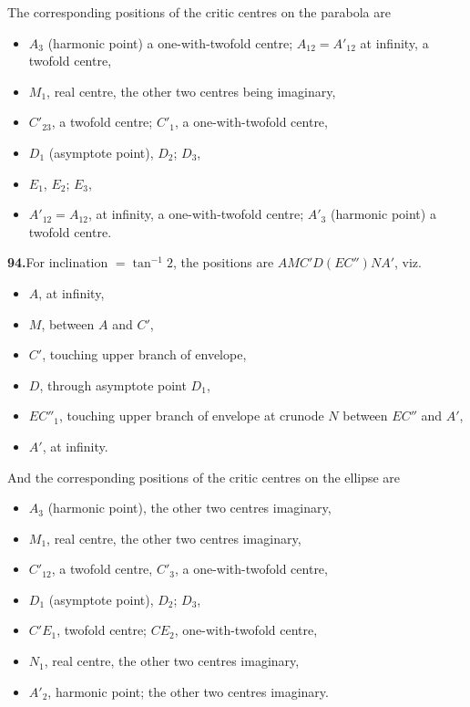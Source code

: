 \documentclass[11pt]{article}
\begin{document}
The corresponding positions of the critic centres on the parabola are
\begin{itemize}\itemsep0pt
\item $A_{3}$ (harmonic point) a one-with-twofold centre; $A_{12} = A'_{12}$ at infinity, a twofold centre,
\item $M_{1}$, real centre, the other two centres being imaginary,
\item $C'_{23}$, a twofold centre; $C'_{1}$, a one-with-twofold centre,
\item $D_{1}$ (asymptote point), $D_{2}$; $D_{3}$,
\item $E_{1}$, $E_{2}$; $E_{3}$,
\item $A'_{12} = A_{12}$, at infinity, a one-with-twofold centre; $A'_{3}$ (harmonic point) a twofold centre.
\end{itemize}

\medskip
\textbf{94.}\quad For inclination $= \tan^{-1} 2$, the positions are $A M C' D (E C'') N A'$, viz.
\begin{itemize}\itemsep0pt
\item $A$, at infinity,
\item $M$, between $A$ and $C'$,
\item $C'$, touching upper branch of envelope,
\item $D$, through asymptote point $D_{1}$,
\item $E C''_{1}$, touching upper branch of envelope at crunode $N$ between $EC''$ and $A'$,
\item $A'$, at infinity.
\end{itemize}

And the corresponding positions of the critic centres on the ellipse are
\begin{itemize}\itemsep0pt
\item $A_{3}$ (harmonic point), the other two centres imaginary,
\item $M_{1}$, real centre, the other two centres imaginary,
\item $C'_{12}$, a twofold centre, $C'_{3}$, a one-with-twofold centre,
\item $D_{1}$ (asymptote point), $D_{2}$; $D_{3}$,
\item $C'E_{1}$, twofold centre; $CE_{2}$, one-with-twofold centre,
\item $N_{1}$, real centre, the other two centres imaginary,
\item $A'_{2}$, harmonic point; the other two centres imaginary.
\end{itemize}
\end{document}
